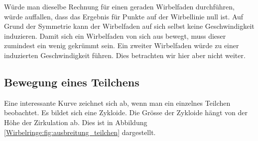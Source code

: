 Würde man dieselbe Rechnung für einen geraden Wirbelfaden durchführen, würde auffallen, dass das Ergebnis für Punkte auf der Wirbellinie null ist.
Auf Grund der Symmetrie kann der Wirbelfaden auf sich selbst keine Geschwindigkeit induzieren.
Damit sich ein Wirbelfaden von sich aus bewegt, muss dieser zumindest ein wenig gekrümmt sein.
Ein zweiter Wirbelfaden würde zu einer induzierten Geschwindigkeit führen. 
Dies betrachten wir hier aber nicht weiter. 

\subsection{Bewegung eines Teilchens}



Eine interessante Kurve zeichnet sich ab, wenn man ein einzelnes Teilchen beobachtet.
Es bildet sich eine Zykloide.
Die Grösse der Zykloide hängt von der Höhe der Zirkulation ab.
Dies ist in Abbildung \ref{Wirbelringe:fig:ausbreitung_teilchen} dargestellt.

